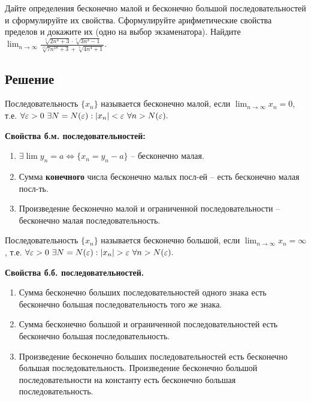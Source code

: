   
    Дайте определения бесконечно малой и бесконечно большой последовательностей и сформулируйте их свойства. Сформулируйте арифметические свойства пределов и докажите их (одно на
выбор экзаменатора). Найдите $\displaystyle \lim_{n\rightarrow \infty} 
            \frac{
                   \sqrt[5]{2n^4 + 3} \cdot 
                   \sqrt[7]{3n^3 - 1}
                 }
                 {
                   \sqrt[15]{7n^{18} + 3} + 
                   \sqrt[3]{4n^4 + 1}
                 }.$
    
    \subsection*{Решение}
    
    \begin{defi} Последовательность $ \{ x_ n \} $ называется бесконечно малой, 
        если $\displaystyle \lim_{n \rightarrow \infty} x_n = 0$, т.е. 
        $\forall \varepsilon > 0\ \exists N = N(\varepsilon):|x_n| < \varepsilon\ \forall n > N(\varepsilon).$
    \end{defi}

    \textbf{Свойства б.м. последовательностей:}
        \begin{enumerate}
            \item $\exists \lim y_n = a \Leftrightarrow \{x_n = y_n - a\}$ -- бесконечно малая.
            \item Сумма \textbf{конечного} числа бесконечно малых посл-ей -- есть бесконечно малая посл-ть.
            \item Произведение бесконечно малой и ограниченной последовательности -- бесконечно малая последовательность.
        \end{enumerate}
    
    \begin{defi} Последовательность $ \{ x_ n \} $ называется бесконечно большой, 
        если $\displaystyle \lim_{n \rightarrow \infty} x_n = \infty$, т.е. 
        $\forall \varepsilon > 0\ \exists N = N(\varepsilon):|x_n| > \varepsilon\ \forall n > N(\varepsilon).$
    \end{defi}
    \textbf{Свойства б.б. последовательностей.}
        \begin{enumerate}
            \item Сумма бесконечно больших последовательностей одного знака есть бесконечно большая последовательность того же знака.
            \item Сумма бесконечно большой и ограниченной последовательностей есть бесконечно большая последовательность.
            \item Произведение бесконечно больших последовательностей есть бесконечно большая последовательность. Произведение бесконечно большой последовательности на константу есть бесконечно большая последовательность.
        \end{enumerate}

